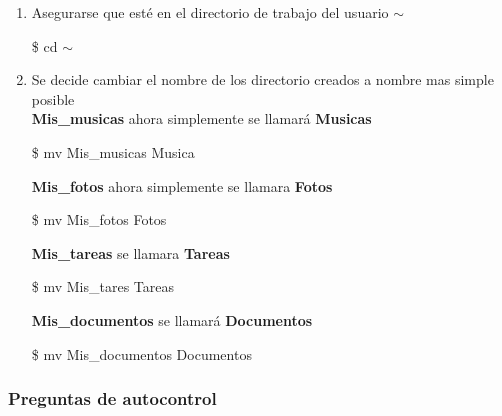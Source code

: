 \documentclass[a4paper,12pt,spanish]{article}
\begin{document}
\begin{enumerate}
   
   \begin{shadedbox}
   \textcolor{white}{{\large {}}}
   \end{shadedbox}
  \item Asegurarse que esté en el directorio de trabajo del  usuario  {\Large $\sim$} 
  \begin{tcolorbox}[colback=gray!5]
   \$ cd $\sim$
 \end{tcolorbox}

\item Se decide cambiar el nombre de los directorio creados a nombre mas simple posible\\
  \textbf{Mis\_musicas} ahora simplemente se llamará  \textbf{Musicas}\\
  \begin{tcolorbox}[colback=gray!5]
    \$ mv  Mis\_musicas  Musica
  \end{tcolorbox}

  \textbf{Mis\_fotos} ahora simplemente se llamara  \textbf{Fotos}\\
  \begin{tcolorbox}[colback=gray!5]
    \$ mv  Mis\_fotos  Fotos
  \end{tcolorbox}
  \textbf{Mis\_tareas} se llamara \textbf{Tareas}\\
  \begin{tcolorbox}[colback=gray!5]
    \$ mv  Mis\_tares  Tareas
  \end{tcolorbox}
  \textbf{Mis\_documentos} se llamará \textbf{Documentos}\\
  \begin{tcolorbox}[colback=gray!5]
    \$ mv  Mis\_documentos  Documentos
  \end{tcolorbox}
  

  
  



    
 \end{enumerate}



\newpage
\subsubsection{Preguntas de autocontrol}
\label{sec:preg-de-autoc-2}
\end{document}
